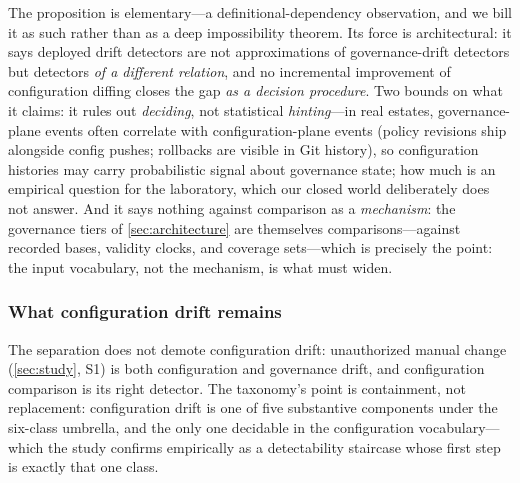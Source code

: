 The proposition is elementary---a definitional-dependency observation, and
we bill it as such rather than as a deep impossibility theorem. Its force is
architectural: it says deployed drift detectors are not approximations of
governance-drift detectors but detectors \emph{of a different relation}, and
no incremental improvement of configuration diffing closes the gap
\emph{as a decision procedure}. Two bounds on what it claims: it rules out
\emph{deciding}, not statistical \emph{hinting}---in real estates,
governance-plane events often correlate with configuration-plane events
(policy revisions ship alongside config pushes; rollbacks are visible in Git
history), so configuration histories may carry probabilistic signal about
governance state; how much is an empirical question for the laboratory, which
our closed world deliberately does not answer. And it says nothing against
comparison as a \emph{mechanism}: the governance tiers of
\cref{sec:architecture} are themselves comparisons---against recorded
bases, validity clocks, and coverage sets---which is precisely the point:
the input vocabulary, not the mechanism, is what must widen.

\subsubsection{What configuration drift remains}
The separation does not demote configuration drift: unauthorized manual
change (\cref{sec:study}, S1) is both configuration and governance drift, and
configuration comparison is its right detector. The taxonomy's point is
containment, not replacement: configuration drift is one of five substantive
components under the six-class umbrella, and the only one decidable in the
configuration vocabulary---which the study confirms
empirically as a detectability staircase whose first step is exactly that one
class.
